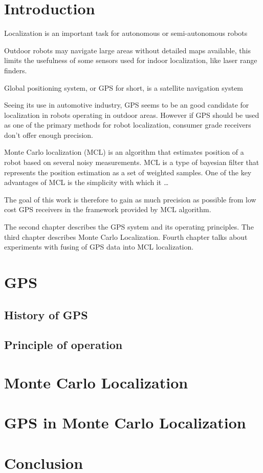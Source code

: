 \documentclass[11pt,notitlepage,a4paper,pdftex]{memoir}
\begin{document}
\chapter{Introduction}

Localization is an important task for autonomous or semi-autonomous robots

Outdoor robots may navigate large areas without detailed maps available, this limits
the usefulness of some sensors used for indoor localization, like laser range finders.

Global positioning system, or GPS for short, is a satellite navigation system


Seeing its use in automotive industry, GPS seems to be an good candidate for
localization in robots operating in outdoor areas.
However if GPS should be used as one of the primary methods for robot localization,
consumer grade receivers don't offer enough precision.

Monte Carlo localization (MCL) is an algorithm that estimates position of a robot
based on several noisy measurements.
MCL is a type of bayesian filter that represents
the position estimation as a set of weighted samples.
One of the key advantages of MCL is the simplicity with which it \ldots

The goal of this work is therefore to gain as much precision as possible from low cost
GPS receivers in the framework provided by MCL algorithm.

The second chapter describes the GPS system and its operating principles.
The third chapter describes Monte Carlo Localization.
Fourth chapter talks about experiments with fusing of GPS data into
MCL localization.

\chapter{GPS}

\section{History of GPS}

\section{Principle of operation}


\chapter{Monte Carlo Localization}

\chapter{GPS in Monte Carlo Localization}

\chapter{Conclusion}
\end{document}
